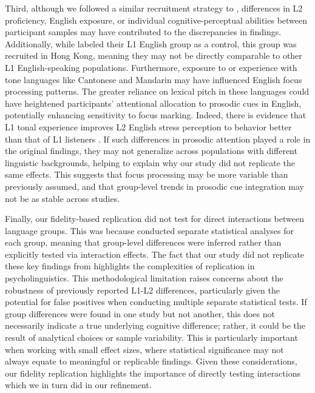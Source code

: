 Third, although we followed a similar recruitment strategy to \cite{Ge2021}, differences in L2 proficiency, English exposure, or individual cognitive-perceptual abilities between participant samples may have contributed to the discrepancies in findings. Additionally, while \cite{Ge2021} labeled their L1 English group as a control, this group was recruited in Hong Kong, meaning they may not be directly comparable to other L1 English-speaking populations. Furthermore, exposure to or experience with tone languages like Cantonese and Mandarin may have influenced English focus processing patterns. The greater reliance on lexical pitch in these languages could have heightened participants’ attentional allocation to prosodic cues in English, potentially enhancing sensitivity to focus marking. Indeed, there is evidence that L1 tonal experience improves L2 English stress perception to behavior better than that of L1 listeners \citep{choi2019better, choi2021cantonese}. If such differences in prosodic attention played a role in the original findings, they may not generalize across populations with different linguistic backgrounds, helping to explain why our study did not replicate the same effects. This suggests that focus processing may be more variable than previously assumed, and that group-level trends in prosodic cue integration may not be as stable across studies. 

Finally, our fidelity-based replication did not test for direct interactions between language groups. This was because \cite{Ge2021} conducted separate statistical analyses for each group, meaning that group-level differences were inferred rather than explicitly tested via interaction effects. The fact that our study did not replicate these key findings from \cite{Ge2021} highlights the complexities of replication in psycholinguistics. This methodological limitation raises concerns about the robustness of previously reported L1-L2 differences, particularly given the potential for false positives when conducting multiple separate statistical tests. If group differences were found in one study but not another, this does not necessarily indicate a true underlying cognitive difference; rather, it could be the result of analytical choices or sample variability. This is particularly important when working with small effect sizes, where statistical significance may not always equate to meaningful or replicable findings. Given these considerations, our fidelity replication highlights the importance of directly testing interactions which we in turn did in our refinement.


